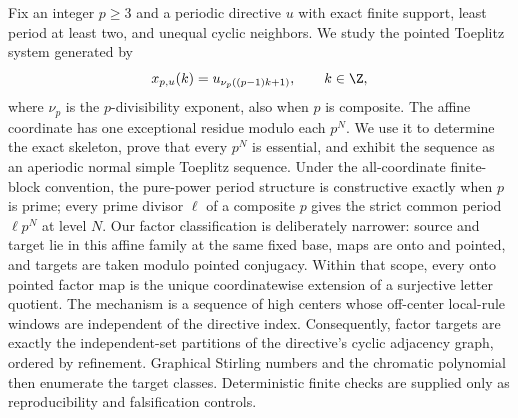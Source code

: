 Fix an integer $p\geq3$ and a periodic directive $u$ with exact finite
support, least period at least two, and unequal cyclic neighbors.  We study
the pointed Toeplitz system generated by
\[
  x_{p,u}(k)=u_{\nu_p((p-1)k+1)},\qquad k\in\Z,
\]
where $\nu_p$ is the $p$-divisibility exponent, also when $p$ is composite.
The affine coordinate has one exceptional residue modulo each $p^N$.  We
use it to determine the exact skeleton, prove that every $p^N$ is essential,
and exhibit the sequence as an aperiodic normal simple Toeplitz sequence.
Under the all-coordinate finite-block convention, the pure-power period
structure is constructive exactly when $p$ is prime; every prime divisor
$\ell$ of a composite $p$ gives the strict common period $\ell p^N$ at
level $N$.  Our factor classification is deliberately narrower: source and
target lie in this affine family at the same fixed base, maps are onto and
pointed, and targets are taken modulo pointed conjugacy.  Within that scope,
every onto pointed factor map is the unique coordinatewise extension of a
surjective letter quotient.  The mechanism is a sequence of high centers whose
off-center local-rule windows are independent of the directive index.
Consequently, factor targets are exactly the independent-set partitions of
the directive's cyclic adjacency graph, ordered by refinement.  Graphical
Stirling numbers and the chromatic polynomial then enumerate the target
classes.  Deterministic finite checks are supplied only as reproducibility
and falsification controls.
